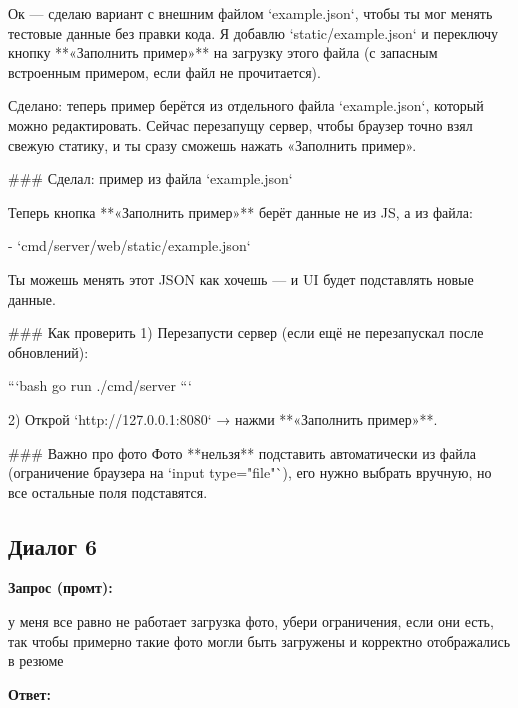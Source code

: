 \documentclass[a4paper, 14pt]{extarticle} %
\begin{document}
\begin{AnswerBlock}

Ок — сделаю вариант с внешним файлом `example.json`, чтобы ты мог менять тестовые данные без правки кода. Я добавлю `static/example.json` и переключу кнопку **«Заполнить пример»** на загрузку этого файла (с запасным встроенным примером, если файл не прочитается).

Сделано: теперь пример берётся из отдельного файла `example.json`, который можно редактировать. Сейчас перезапущу сервер, чтобы браузер точно взял свежую статику, и ты сразу сможешь нажать «Заполнить пример».

### Сделал: пример из файла `example.json`

Теперь кнопка **«Заполнить пример»** берёт данные не из JS, а из файла:

- `cmd/server/web/static/example.json`

Ты можешь менять этот JSON как хочешь — и UI будет подставлять новые данные.

### Как проверить
1) Перезапусти сервер (если ещё не перезапускал после обновлений):

```bash
go run ./cmd/server
```

2) Открой `http://127.0.0.1:8080` → нажми **«Заполнить пример»**.

### Важно про фото
Фото **нельзя** подставить автоматически из файла (ограничение браузера на `input type="file"`), его нужно выбрать вручную, но все остальные поля подставятся.

\end{AnswerBlock}

\subsection*{Диалог 6}

\textbf{Запрос (промт):}

\begin{PromptBlock}

у меня все равно не работает загрузка фото, убери ограничения, если они есть, так чтобы примерно такие фото могли быть загружены и корректно отображались в резюме

\end{PromptBlock}

\textbf{Ответ:}
\end{document}
